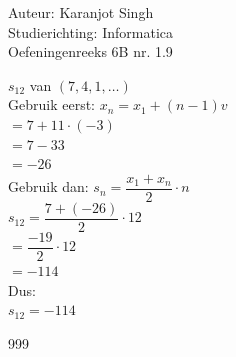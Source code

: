 \documentclass[a4paper]{article}
\begin{document}
\noindent \large Auteur: Karanjot Singh\\
\noindent \large Studierichting: Informatica\\
\noindent \large Oefeningenreeks 6B nr. 1.9\\

\normalsize

$s_{12}$ van $(7, 4, 1, \ldots)$\\

Gebruik eerst: $x_n = x_1 + (n - 1) v$\\

$= 7 + 11 \cdot (-3)$\\

$= 7 - 33$\\

$= -26$\\

Gebruik dan: $s_n = \dfrac{x_1 + x_n}{2} \cdot n$\\

$s_{12} = \dfrac{7 + (-26)}{2} \cdot 12$\\

$= \dfrac{-19}{2} \cdot 12$\\

$= -114$\\

Dus:\\

$s_{12} = -114$\\

\begin{thebibliography}{999}
\end{thebibliography}
\end{document}
